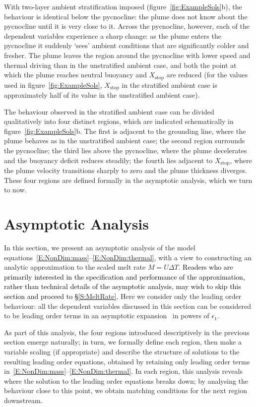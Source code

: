 \documentclass[openacc]{rsproca_new}%
\newcommand{\blue}[1]{{\color{blue} #1}}
\renewcommand{\blue}[1]{{\textcolor{black}{#1}}} %
\newcommand{\epsone}{\epsilon_{1}} %
\begin{document}
With two-layer ambient stratification imposed (figure~\ref{fig:ExampleSols}b), the behaviour is identical below the pycnocline: the plume does not know about the pycnocline until it is very close to it. Across the pycnocline, however, each of the dependent variables experience a sharp change: as the plume enters the pycnocline it suddenly `sees' ambient conditions that are significantly colder and fresher. The plume leaves the region around the pycnocline with lower speed and thermal driving than in the unstratified ambient case, and both the point at which the plume reaches neutral buoyancy and $X_\text{stop}$ are reduced (for the values used in figure~\ref{fig:ExampleSols}, $X_{\text{stop}}$ in  the stratified ambient case is approximately half of its value in the unstratified ambient case).

The behaviour observed in the stratified ambient case can be divided qualitatively into four distinct regions, which are indicated schematically in figure~\ref{fig:ExampleSols}b. The first is adjacent to the grounding line, where the plume behaves as in the unstratified ambient case; the second region surrounds the pycnocline; the third lies above the pycnocline, where the plume decelerates and the buoyancy deficit reduces steadily; the fourth lies adjacent to $X_{\text{stop}}$, where the plume velocity transitions sharply to zero and the plume thickness diverges.  These four regions are defined formally in the asymptotic analysis, which we turn to now. 

\section{Asymptotic Analysis}\label{S:Asymptotics}
In this section, we present an asymptotic analysis of the model equations~\eqref{E:NonDim:mass}--\eqref{E:NonDim:thermal}, with a view to constructing an analytic approximation to the scaled melt rate $M = U \Delta T$. \blue{Readers who are primarily interested in the specification and performance of the approximation, rather than technical details of the asymptotic analysis, may wish to skip this section and proceed to \S\ref{S:MeltRate}.} Here we consider only the leading order behaviour: all the dependent variables discussed in this section can be considered to be leading order terms in an asymptotic expansion~\cite{HinchPerturbationMethods} in powers of $\epsone$. 

As part of this analysis, the four regions introduced descriptively in the previous section emerge naturally; in turn, we formally define each region, then make a variable scaling (if appropriate) and describe the structure of solutions to the resulting leading order equations, obtained by retaining only leading order terms in~\eqref{E:NonDim:mass}--\eqref{E:NonDim:thermal}. In each region, this analysis reveals where the solution to the leading order equations breaks down; by analysing the behaviour close to this point, we obtain matching conditions for the next region downstream. %
\end{document}
